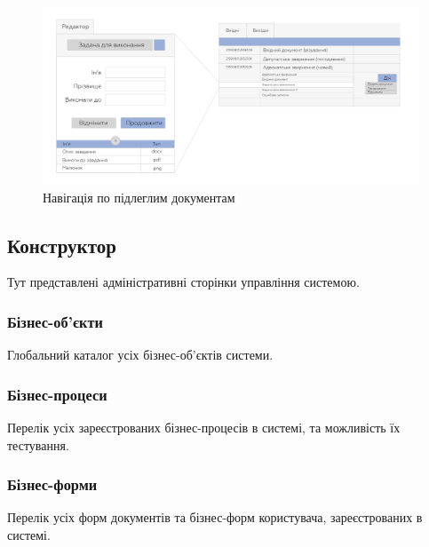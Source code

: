 \begin{figure}[!htbp]
\centerline{\includegraphics[scale=0.4]{searchBpe.png}}
\caption{Навігація по підлеглим документам}
\end{figure}

\newpage
\subsection{Конструктор}

Тут представлені адміністративні сторінки управління системою.

\subsubsection{Бізнес-об'єкти}

Глобальний каталог усіх бізнес-об'єктів системи.

\subsubsection{Бізнес-процеси}

Перелік усіх зареєстрованих бізнес-процесів в системі, та можливість їх тестування.


\newpage
\subsubsection{Бізнес-форми}

Перелік усіх форм документів та бізнес-форм користувача, зареєстрованих в системі.




